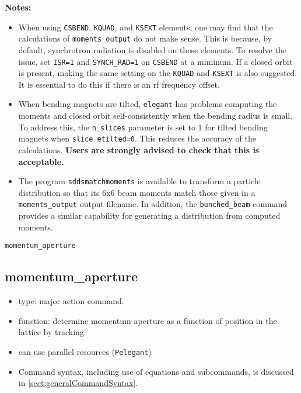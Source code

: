 \documentclass[11pt]{article}
\begin{document}
{\bf Notes:} 
\begin{itemize}
\item  When using \verb|CSBEND|, \verb|KQUAD|, and \verb|KSEXT| elements, one may find that the 
calculations of \verb|moments_output| do not make sense. This is because, by default, synchrotron
radiation is disabled on these elements. To resolve the issue, set \verb|ISR=1| and \verb|SYNCH_RAD=1|
on  \verb|CSBEND| at a miminum. If a closed orbit is present, making the same setting on 
the  \verb|KQUAD| and \verb|KSEXT| is also suggested. It is essential to do this if there is
an rf frequency offset.
\item When bending magnets are tilted, \verb|elegant| has problems computing the moments and
closed orbit self-consistently when the bending radius is small.  To address this, the \verb|n_slices| parameter is set to 1 for
tilted bending magnets when \verb|slice_etilted=0|. This reduces the accuracy of the calculations.
{\bf Users are strongly advised to check that this is acceptable.} 
\item The program \verb|sddsmatchmoments| is available to transform a particle distribution so that its 6x6 beam moments
  match those given in a \verb|moments_output| output filename. 
  In addition, the \verb|bunched_beam| command provides a similar capability for generating a distribution from computed
  moments.
\end{itemize}

\newpage
\begin{center}{\Large\verb|momentum_aperture|}\end{center}
\subsection{momentum\_aperture \label{subsec:momentumaperture}}

\begin{itemize}
\item type: major action command.
\item function: determine momentum aperture as a function of position in the lattice by tracking
\item can use parallel resources (\verb|Pelegant|)
\item Command syntax, including use of equations and subcommands, is discussed in \ref{sect:generalCommandSyntax}.
\end{itemize}
\end{document}
